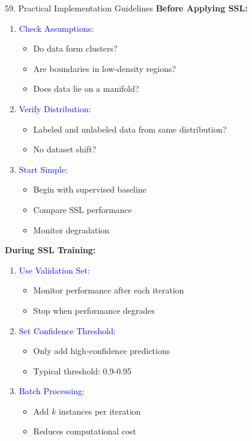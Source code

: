 \documentclass[8pt]{beamer}
\begin{document}
	\begin{frame}{59. Practical Implementation Guidelines}
		\fontsize{6.5}{7.5}\selectfont
		\textbf{Before Applying SSL:}
		\begin{enumerate}
			\item \textcolor{blue}{Check Assumptions:}
			\begin{itemize}
				\item Do data form clusters?
				\item Are boundaries in low-density regions?
				\item Does data lie on a manifold?
			\end{itemize}
			
			\item \textcolor{blue}{Verify Distribution:}
			\begin{itemize}
				\item Labeled and unlabeled data from same distribution?
				\item No dataset shift?
			\end{itemize}
			
			\item \textcolor{blue}{Start Simple:}
			\begin{itemize}
				\item Begin with supervised baseline
				\item Compare SSL performance
				\item Monitor degradation
			\end{itemize}
		\end{enumerate}
		
		\textbf{During SSL Training:}
		\begin{enumerate}
			\item \textcolor{blue}{Use Validation Set:}
			\begin{itemize}
				\item Monitor performance after each iteration
				\item Stop when performance degrades
			\end{itemize}
			
			\item \textcolor{blue}{Set Confidence Threshold:}
			\begin{itemize}
				\item Only add high-confidence predictions
				\item Typical threshold: 0.9-0.95
			\end{itemize}
			
			\item \textcolor{blue}{Batch Processing:}
			\begin{itemize}
				\item Add $k$ instances per iteration
				\item Reduces computational cost
			\end{itemize}
		\end{enumerate}
	\end{frame}
	
\end{document}
